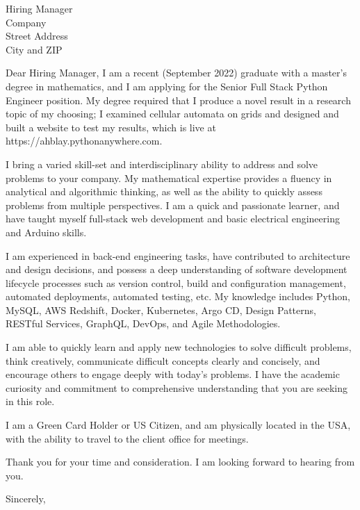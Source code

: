 \documentclass{letter}%
\begin{document}
%
\normalsize%
\begin{letter}{Hiring Manager \\ Company \\ Street Address \\ City and ZIP}%

Dear Hiring Manager, 
I am a recent (September 2022) graduate with a master’s degree in mathematics, and I am applying for the Senior Full Stack Python Engineer position. My degree required that I produce a novel result in a research topic of my choosing; I examined cellular automata on grids and designed and built a website to test my results, which is live at https://ahblay.pythonanywhere.com.

I bring a varied skill-set and interdisciplinary ability to address and solve problems to your company. My mathematical expertise provides a fluency in analytical and algorithmic thinking, as well as the ability to quickly assess problems from multiple perspectives. I am a quick and passionate learner, and have taught myself full-stack web development and basic electrical engineering and Arduino skills. 

I am experienced in back-end engineering tasks, have contributed to architecture and design decisions, and possess a deep understanding of software development lifecycle processes such as version control, build and configuration management, automated deployments, automated testing, etc. My knowledge includes Python, MySQL, AWS Redshift, Docker, Kubernetes, Argo CD, Design Patterns, RESTful Services, GraphQL, DevOps, and Agile Methodologies.

I am able to quickly learn and apply new technologies to solve difficult problems, think creatively, communicate difficult concepts clearly and concisely, and encourage others to engage deeply with today’s problems. I have the academic curiosity and commitment to comprehensive understanding that you are seeking in this role. 

I am a Green Card Holder or US Citizen, and am physically located in the USA, with the ability to travel to the client office for meetings. 

Thank you for your time and consideration. I am looking forward to hearing from you. 
%
\closing{Sincerely,}%
%
\end{letter}%
\end{document}
